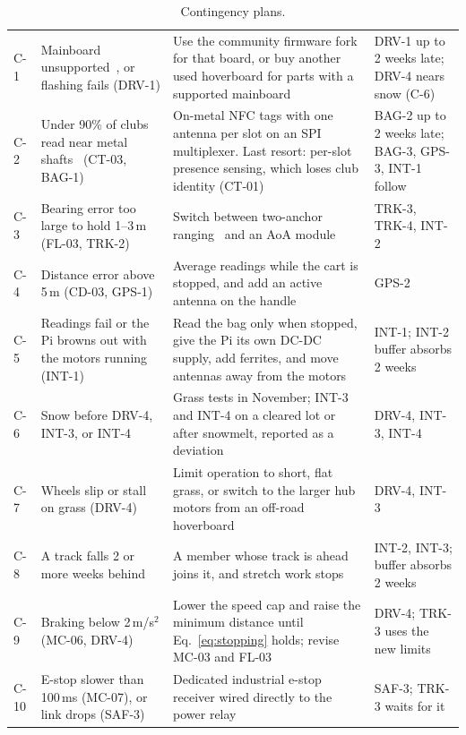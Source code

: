 \begin{table}[!htbp]
\centering
\caption{Contingency plans.}
\label{tab:contingencies}
\footnotesize\renewcommand{\arraystretch}{1.0}
\begin{tabularx}{\linewidth}{@{}L{0.32in} L{1.6in} Y L{1.25in}@{}}
 &  &  &  \\
\midrule
C-1 & Mainboard unsupported~\cite{feruFoc}, or flashing fails (DRV-1) & Use the community firmware fork for that board, or buy another used hoverboard for parts with a supported mainboard & DRV-1 up to 2 weeks late; DRV-4 nears snow (C-6) \\
\addlinespace[2pt]
C-2 & Under 90\% of clubs read near metal shafts~\cite{dobkin2005rfid,mfrc522ds} (CT-03, BAG-1) & On-metal \acs{NFC} tags with one antenna per slot on an \acs{SPI} multiplexer. Last resort: per-slot presence sensing, which loses club identity (CT-01) & BAG-2 up to 2 weeks late; BAG-3, GPS-3, INT-1 follow \\
\addlinespace[2pt]
C-3 & Bearing error too large to hold 1--3\,m (FL-03, TRK-2) & Switch between two-anchor ranging~\cite{bae2022uwb} and an \acs{AoA} module~\cite{zhang2024stroller} & TRK-3, TRK-4, INT-2 \\
\addlinespace[2pt]
C-4 & Distance error above 5\,m (CD-03, GPS-1) & Average readings while the cart is stopped, and add an active antenna on the handle & GPS-2 \\
\addlinespace[2pt]
C-5 & Readings fail or the Pi browns out with the motors running (INT-1) & Read the bag only when stopped, give the Pi its own \acs{DC-DC} supply, add ferrites, and move antennas away from the motors & INT-1; INT-2 buffer absorbs 2 weeks \\
\addlinespace[2pt]
C-6 & Snow before DRV-4, INT-3, or INT-4 & Grass tests in November; INT-3 and INT-4 on a cleared lot or after snowmelt, reported as a deviation & DRV-4, INT-3, INT-4 \\
\addlinespace[2pt]
C-7 & Wheels slip or stall on grass (DRV-4) & Limit operation to short, flat grass, or switch to the larger hub motors from an off-road hoverboard & DRV-4, INT-3 \\
\addlinespace[2pt]
C-8 & A track falls 2 or more weeks behind & A member whose track is ahead joins it, and stretch work stops & INT-2, INT-3; buffer absorbs 2 weeks \\
\addlinespace[2pt]
C-9 & Braking below 2\,m/s$^2$ (MC-06, DRV-4) & Lower the speed cap and raise the minimum distance until Eq.~\eqref{eq:stopping} holds; revise MC-03 and FL-03 & DRV-4; TRK-3 uses the new limits \\
\addlinespace[2pt]
C-10 & E-stop slower than 100\,ms (MC-07), or link drops (SAF-3) & Dedicated industrial e-stop receiver wired directly to the power relay~\cite{iso13850} & SAF-3; TRK-3 waits for it \\
\bottomrule
\end{tabularx}
\end{table}

